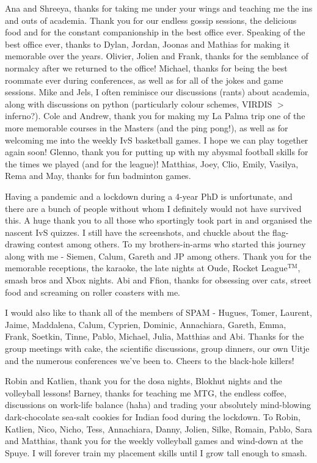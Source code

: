 Ana and Shreeya, thanks for taking me under your wings and teaching me the ins and outs of academia. Thank you for our endless gossip sessions, the delicious food and for the constant companionship in the best office ever. Speaking of the best office ever, thanks to Dylan, Jordan, Joonas and Mathias for making it memorable over the years. Olivier, Jolien and Frank, thanks for the semblance of normalcy after we returned to the office! Michael, thanks for being the best roommate ever during conferences, as well as for all of the jokes and game sessions. Mike and Jels, I often reminisce our discussions (rants) about academia, along with discussions on python (particularly colour schemes, VIRDIS $>$ inferno?). Cole and Andrew, thank you for making my La Palma trip one of the more memorable courses in the Masters (and the ping pong!), as well as for welcoming me into the weekly IvS basketball games. I hope we can play together again soon! Glenno, thank you for putting up with my abysmal football skills for the times we played (and for the league)! Matthias, Joey, Clio, Emily, Vasilya, Rema and May, thanks for fun badminton games.

Having a pandemic and a lockdown during a 4-year PhD is unfortunate, and there are a bunch of people without whom I definitely would not have survived this. A huge thank you to all those who sportingly took part in and organised the nascent IvS quizzes. I still have the screenshots, and chuckle about the flag-drawing contest among others. To my brothers-in-arms who started this journey along with me - Siemen, Calum, Gareth and JP among others. Thank you for the memorable receptions, the karaoke, the late nights at Oude, Rocket League$^{\textrm{TM}}$, smash bros and Xbox nights. Abi and Ffion, thanks for obsessing over cats, street food and screaming on roller coasters with me.

I would also like to thank all of the members of SPAM - Hugues, Tomer, Laurent, Jaime, Maddalena, Calum, Cyprien, Dominic, Annachiara, Gareth, Emma, Frank, Soetkin, Tinne, Pablo, Michael, Julia, Matthias and Abi. Thanks for the group meetings with cake, the scientific discussions, group dinners, our own Uitje and the numerous conferences we've been to. Cheers to the black-hole killers!

Robin and Katlien, thank you for the dosa nights, Blokhut nights and the volleyball lessons! Barney, thanks for teaching me MTG, the endless coffee, discussions on work-life balance (haha) and trading your absolutely mind-blowing dark-chocolate sea-salt cookies for Indian food during the lockdown. To Robin, Katlien, Nico, Nicho, Tess, Annachiara, Danny, Jolien, Silke, Romain, Pablo, Sara and Matthias, thank you for the weekly volleyball games and wind-down at the Spuye. I will forever train my placement skills until I grow tall enough to smash.

